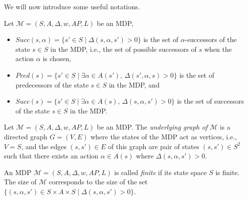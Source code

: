 We will now introduce some useful notations.

\begin{notation}
  Let $\mathcal{M}=(S, A, \Delta, w, AP, L)$ be an MDP,
  \begin{itemize}
    \item $Succ(s, \alpha) = \{ s' \in S \; | \; \Delta(s, \alpha, s') > 0 \}$
      is the set of $\alpha$-successors of the state $s \in S$ in the MDP, i.e., the set of possible successors of $s$ when the action $\alpha$ is chosen,
    \item $Pred(s) = \{ s' \in S \; | \; \exists \alpha \in A(s'), \, \Delta(s', \alpha, s) > 0 \}$ is the set of predecessors of the state $s \in S$ in the MDP, and
    \item $Succ(s) = \{ s' \in S \; | \; \exists \alpha \in A(s), \, \Delta(s, \alpha, s') > 0 \}$ is the set of successors of the state $s \in S$ in the MDP.
  \end{itemize}
\end{notation}

\begin{definition}
  Let $\mathcal{M}=(S, A, \Delta, w, AP, L)$ be an MDP. The \textit{underlying graph of} $\mathcal{M}$ is a directed graph $G = (V, E)$ where the states of the MDP act as vertices, i.e., $V = S$, and the edges $(s, s') \in E$ of this graph are pair of states $(s, s')\in S^2$ such that there exists an action $\alpha \in A(s)$ where $\Delta(s, \alpha, s')>0$.
\end{definition}

\begin{notation}
  An MDP $\mathcal{M}=(S, A, \Delta, w, AP, L)$ is called \textit{finite} if its state space $S$ is finite. The size of $\mathcal{M}$ corresponds to the size
  of the set $\{(s, \alpha, s') \in S \times A \times S \; | \; \Delta(s, \alpha, s') > 0 \}$.
\end{notation}


